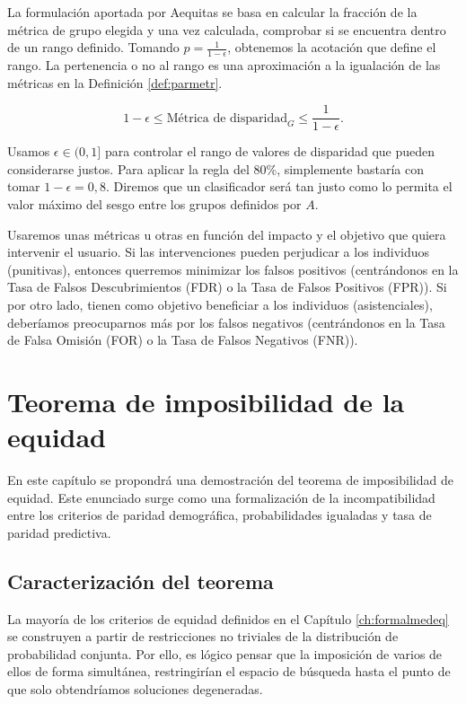 \documentclass[oneside,openright,titlepage,numbers=noenddot,openany,headinclude,footinclude=true,
cleardoublepage=empty,abstractoff,BCOR=5mm,paper=a4,fontsize=12pt,main=spanish]{scrreprt}
\begin{document}
La formulación aportada por Aequitas se basa en calcular la fracción de la métrica de grupo elegida y una vez calculada, comprobar si se encuentra dentro de un rango definido. Tomando $p=\frac{1}{1-\epsilon}$, obtenemos la acotación que define el rango. La pertenencia o no al rango es una aproximación a la igualación de las métricas en la Definición \ref{def:parmetr}.

\begin{equation}
1-\epsilon \leq \text{Métrica de disparidad}_{G} \leq \frac{1}{1-\epsilon}.
\end{equation}

Usamos $\epsilon \in
(0,1]$ para controlar el rango de valores de disparidad que pueden considerarse justos. Para aplicar la regla del 80\%, simplemente bastaría con tomar $1-\epsilon=0,8$. Diremos que un clasificador será tan justo como lo permita el valor máximo del sesgo entre los grupos definidos por $A$. 

Usaremos unas métricas u otras en función del impacto y el objetivo que quiera intervenir el usuario. Si las intervenciones pueden perjudicar a los individuos (punitivas), entonces querremos minimizar los falsos positivos (centrándonos en la Tasa de Falsos Descubrimientos (FDR) o la Tasa de Falsos Positivos (FPR)). Si por otro lado, tienen como objetivo beneficiar a los individuos (asistenciales), deberíamos preocuparnos más por los falsos negativos (centrándonos en la Tasa de Falsa Omisión (FOR) o la Tasa de Falsos Negativos (FNR)).

\chapter{Teorema de imposibilidad de la equidad}

\label{ch:teoremaimposibilidad}

En este capítulo se propondrá una demostración del teorema de imposibilidad de equidad. Este enunciado surge como una formalización de la incompatibilidad entre los criterios de paridad demográfica, probabilidades igualadas y tasa de paridad predictiva.

\section{Caracterización del teorema}

La mayoría de los criterios de equidad definidos en el Capítulo \ref{ch:formalmedeq} se construyen a partir de restricciones no triviales de la distribución de probabilidad conjunta. Por ello, es lógico pensar que la imposición de varios de ellos de forma simultánea, restringirían el espacio de búsqueda hasta el punto de que solo obtendríamos soluciones degeneradas.
\end{document}
